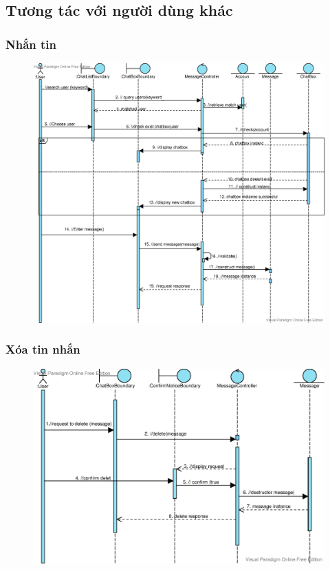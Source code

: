 \documentclass[./../main_file.tex]{subfiles}
\begin{document}
	\subsection{Tương tác với người dùng khác }
	\subsubsection{Nhắn tin}
	\begin{figure}[H]
		\centering
		\includegraphics[width=\linewidth]{./images/sequence_diagram/3_3_1_Message.eps}
	\end{figure}
	\subsubsection{Xóa tin nhắn}
	\begin{figure}[H]
		\centering
		\includegraphics[width=\linewidth]{./images/sequence_diagram/3_3_2_MessageDelete.eps}
	\end{figure}
\end{document}
